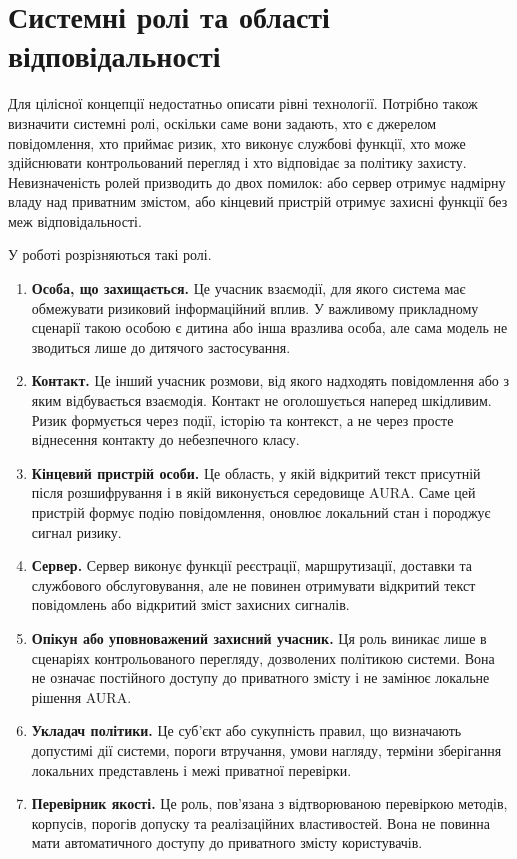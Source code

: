 \section{Системні ролі та області відповідальності}
\label{sec:system-roles}

Для цілісної концепції недостатньо описати рівні технології. Потрібно також визначити системні ролі, оскільки саме вони задають, хто є джерелом повідомлення, хто приймає ризик, хто виконує службові функції, хто може здійснювати контрольований перегляд і хто відповідає за політику захисту. Невизначеність ролей призводить до двох помилок: або сервер отримує надмірну владу над приватним змістом, або кінцевий пристрій отримує захисні функції без меж відповідальності.

У роботі розрізняються такі ролі.

\begin{enumerate}
  \item \textbf{Особа, що захищається.} Це учасник взаємодії, для якого система має обмежувати ризиковий інформаційний вплив. У важливому прикладному сценарії такою особою є дитина або інша вразлива особа, але сама модель не зводиться лише до дитячого застосування.
  \item \textbf{Контакт.} Це інший учасник розмови, від якого надходять повідомлення або з яким відбувається взаємодія. Контакт не оголошується наперед шкідливим. Ризик формується через події, історію та контекст, а не через просте віднесення контакту до небезпечного класу.
  \item \textbf{Кінцевий пристрій особи.} Це область, у якій відкритий текст присутній після розшифрування і в якій виконується середовище AURA. Саме цей пристрій формує подію повідомлення, оновлює локальний стан і породжує сигнал ризику.
  \item \textbf{Сервер.} Сервер виконує функції реєстрації, маршрутизації, доставки та службового обслуговування, але не повинен отримувати відкритий текст повідомлень або відкритий зміст захисних сигналів.
  \item \textbf{Опікун або уповноважений захисний учасник.} Ця роль виникає лише в сценаріях контрольованого перегляду, дозволених політикою системи. Вона не означає постійного доступу до приватного змісту і не замінює локальне рішення AURA.
  \item \textbf{Укладач політики.} Це суб'єкт або сукупність правил, що визначають допустимі дії системи, пороги втручання, умови нагляду, терміни зберігання локальних представлень і межі приватної перевірки.
  \item \textbf{Перевірник якості.} Це роль, пов'язана з відтворюваною перевіркою методів, корпусів, порогів допуску та реалізаційних властивостей. Вона не повинна мати автоматичного доступу до приватного змісту користувачів.
\end{enumerate}

